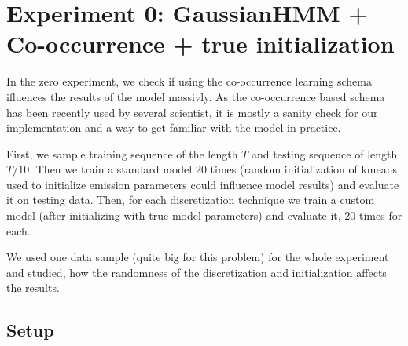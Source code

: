 \documentclass[shortabstract]{iithesis}
\begin{document}
\section{Experiment 0: GaussianHMM + Co-occurrence + true initialization}

In the zero experiment, we check if using the co-occurrence learning schema ifluences the results of the model massivly. As the co-occurrence based schema has been recently used by several scientist, it is mostly a sanity check for our implementation and a way to get familiar with the model in practice. 

First, we sample training sequence of the length $T$ and testing sequence of length $T / 10$. Then we train a standard model 20 times (random initialization of kmeans used to initialize emission parameters could influence model results) and evaluate it on testing data. 
Then, for each discretization technique we train a custom model (after initializing with true model parameters) and evaluate it, 20 times for each.

We used one data sample (quite big for this problem) for the whole experiment and studied, how the randomness of the discretization and initialization affects the results. 

\subsection{Setup} \label{sec:ex0_setup}
\end{document}

